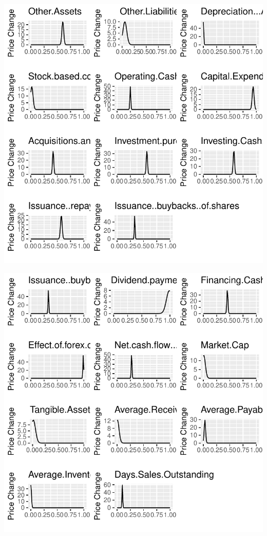 \documentclass[11pt,]{article}
\begin{document}
\begin{center}\includegraphics{stock_analysis_files/figure-latex/data normal distribution plot4-1} \end{center}

\begin{center}\includegraphics{stock_analysis_files/figure-latex/data normal distribution plot5-1} \end{center}
\end{document}
